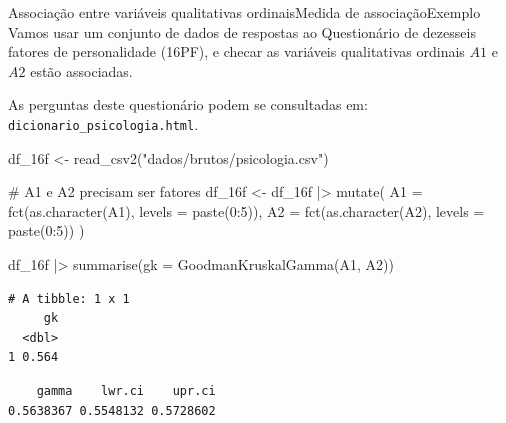 \documentclass[
  10pt,
  ignorenonframetext,
]{beamer}
\newenvironment{Shaded}{\begin{snugshade}}{\end{snugshade}}
\newcommand{\AttributeTok}[1]{\textcolor[rgb]{0.40,0.45,0.13}{#1}}
\newcommand{\CommentTok}[1]{\textcolor[rgb]{0.37,0.37,0.37}{#1}}
\newcommand{\DecValTok}[1]{\textcolor[rgb]{0.68,0.00,0.00}{#1}}
\newcommand{\FloatTok}[1]{\textcolor[rgb]{0.68,0.00,0.00}{#1}}
\newcommand{\FunctionTok}[1]{\textcolor[rgb]{0.28,0.35,0.67}{#1}}
\newcommand{\NormalTok}[1]{\textcolor[rgb]{0.00,0.23,0.31}{#1}}
\newcommand{\OtherTok}[1]{\textcolor[rgb]{0.00,0.23,0.31}{#1}}
\newcommand{\SpecialCharTok}[1]{\textcolor[rgb]{0.37,0.37,0.37}{#1}}
\newcommand{\StringTok}[1]{\textcolor[rgb]{0.13,0.47,0.30}{#1}}
\begin{document}
\begin{frame}[fragile]{Associação entre variáveis qualitativas
ordinais\newline Medida de associação\newline Exemplo}
\protect\hypertarget{associauxe7uxe3o-entre-variuxe1veis-qualitativas-ordinaismedida-de-associauxe7uxe3oexemplo}{}
Vamos usar um conjunto de dados de respostas ao Questionário de
dezesseis fatores de personalidade (16PF), e checar as variáveis
qualitativas ordinais \(A1\) e \(A2\) estão associadas.

As perguntas deste questionário podem se consultadas em:
\texttt{dicionario\_psicologia.html}.
\end{frame}

\begin{frame}[fragile]
\begin{Shaded}
\begin{Highlighting}[]
\NormalTok{df\_16f }\OtherTok{\textless{}{-}} \FunctionTok{read\_csv2}\NormalTok{(}\StringTok{"dados/brutos/psicologia.csv"}\NormalTok{)}

\CommentTok{\# A1 e A2 precisam ser fatores}
\NormalTok{df\_16f }\OtherTok{\textless{}{-}}\NormalTok{ df\_16f }\SpecialCharTok{|\textgreater{}} 
  \FunctionTok{mutate}\NormalTok{(}
    \AttributeTok{A1 =} \FunctionTok{fct}\NormalTok{(}\FunctionTok{as.character}\NormalTok{(A1), }\AttributeTok{levels =} \FunctionTok{paste}\NormalTok{(}\DecValTok{0}\SpecialCharTok{:}\DecValTok{5}\NormalTok{)),}
    \AttributeTok{A2 =} \FunctionTok{fct}\NormalTok{(}\FunctionTok{as.character}\NormalTok{(A2), }\AttributeTok{levels =} \FunctionTok{paste}\NormalTok{(}\DecValTok{0}\SpecialCharTok{:}\DecValTok{5}\NormalTok{))}
\NormalTok{  )}

\NormalTok{df\_16f }\SpecialCharTok{|\textgreater{}}
  \FunctionTok{summarise}\NormalTok{(}\AttributeTok{gk =} \FunctionTok{GoodmanKruskalGamma}\NormalTok{(A1, A2))}
\end{Highlighting}
\end{Shaded}

\begin{verbatim}
# A tibble: 1 x 1
     gk
  <dbl>
1 0.564
\end{verbatim}

\begin{Shaded}
\end{Shaded}

\begin{verbatim}
    gamma    lwr.ci    upr.ci 
0.5638367 0.5548132 0.5728602 
\end{verbatim}
\end{frame}
\end{document}
